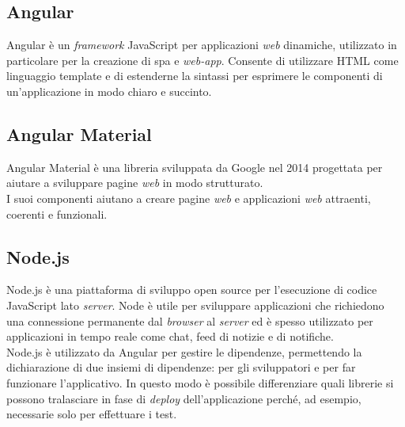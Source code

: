 \subsection*{Angular}
Angular è un \textit{framework} JavaScript per applicazioni \textit{web} dinamiche, utilizzato in particolare per la creazione di \gls{spa} e \textit{web-app}. Consente di utilizzare HTML come linguaggio template e di estenderne la sintassi per esprimere le componenti di un'applicazione in modo chiaro e succinto.

\subsection*{Angular Material}
Angular Material è una libreria sviluppata da Google nel 2014 progettata per aiutare a sviluppare pagine \textit{web} in modo strutturato. \\
I suoi componenti aiutano a creare pagine \textit{web} e applicazioni \textit{web} attraenti, coerenti e funzionali.

\subsection*{Node.js}
Node.js è una piattaforma di sviluppo open source per l'esecuzione di codice JavaScript lato \textit{server}. Node è utile per sviluppare applicazioni che richiedono una connessione permanente dal \textit{browser} al \textit{server} ed è spesso utilizzato per applicazioni in tempo reale come chat, feed di notizie e di notifiche.\\
Node.js è utilizzato da Angular per gestire le dipendenze, permettendo la dichiarazione di due insiemi di dipendenze: per gli sviluppatori e per far funzionare l'applicativo. In questo modo è possibile differenziare quali librerie si possono tralasciare in fase di \textit{deploy} dell'applicazione perché, ad esempio, necessarie solo per effettuare i test.

